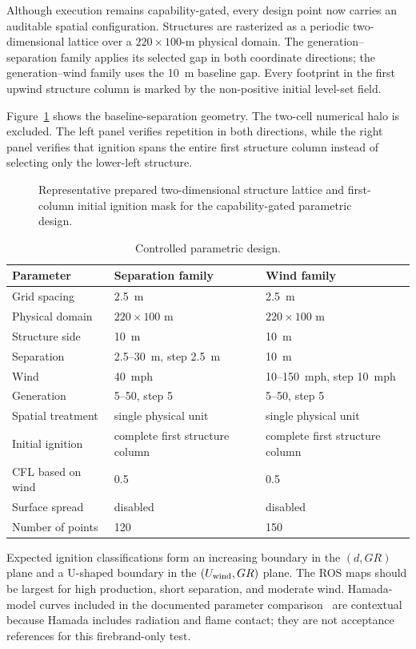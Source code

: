 Although execution remains capability-gated, every design point now carries an
auditable spatial configuration. Structures are rasterized as a periodic
two-dimensional lattice over a \(220\times100\)-m physical domain. The
generation--separation family applies its selected gap in both coordinate
directions; the generation--wind family uses the \SI{10}{m} baseline gap.
Every footprint in the first upwind structure column is marked by the
non-positive initial level-set field.

Figure~\ref{fig:input-configuration} shows the baseline-separation geometry.
The two-cell numerical halo is excluded. The left panel verifies repetition in
both directions, while the right panel verifies that ignition spans the entire
first structure column instead of selecting only the lower-left structure.

\begin{figure}[H]
\centering
{}
\caption{Representative prepared two-dimensional structure lattice and first-column
initial ignition mask for the capability-gated parametric design.}
\label{fig:input-configuration}
\end{figure}


\begin{table}[H]
\centering\small
\caption{Controlled parametric design.}
\begin{tabular}{lll}
\toprule
Parameter & Separation family & Wind family\tabularnewline
\midrule
Grid spacing & \SI{2.5}{m} & \SI{2.5}{m}\tabularnewline
Physical domain & \(220\times100\) m & \(220\times100\) m\tabularnewline
Structure side & \SI{10}{m} & \SI{10}{m}\tabularnewline
Separation & 2.5--\SI{30}{m}, step \SI{2.5}{m} & \SI{10}{m}\tabularnewline
Wind & \SI{40}{mph} & 10--\SI{150}{mph}, step \SI{10}{mph}\tabularnewline
Generation & 5--50, step 5 & 5--50, step 5\tabularnewline
Spatial treatment & single physical unit & single physical unit\tabularnewline
Initial ignition & complete first structure column & complete first structure column\tabularnewline
CFL based on wind & 0.5 & 0.5\tabularnewline
Surface spread & disabled & disabled\tabularnewline
Number of points & 120 & 150\tabularnewline
\bottomrule
\end{tabular}
\end{table}

Expected ignition classifications form an increasing boundary in the
\((d,GR)\) plane and a U-shaped boundary in the
\((U_{\rm wind},GR)\) plane. The ROS maps should be largest for high
production, short separation, and moderate wind. Hamada-model curves included
in the documented parameter comparison~\cite{Qin2025,QinEtAl2026} are
contextual because Hamada includes radiation and flame contact; they are not
acceptance references for this firebrand-only test.

